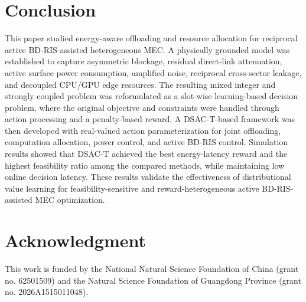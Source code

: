 \documentclass[conference]{IEEEtran}
\begin{document}
\section{Conclusion}

This paper studied energy-aware offloading and resource allocation for reciprocal active BD-RIS-assisted heterogeneous MEC. A physically grounded model was established to capture asymmetric blockage, residual direct-link attenuation, active surface power consumption, amplified noise, reciprocal cross-sector leakage, and decoupled CPU/GPU edge resources. The resulting mixed integer and strongly coupled problem was reformulated as a 
slot-wise learning-based decision problem, where the original objective and constraints were handled through action processing and a penalty-based reward. 
A DSAC-T-based framework was then developed with real-valued action parameterization for joint offloading, computation allocation, power control, and active BD-RIS control. Simulation results showed that DSAC-T achieved 
the best energy-latency reward and the highest feasibility ratio among the compared methods, while maintaining low online decision latency. These results validate the effectiveness of distributional value learning for feasibility-sensitive and reward-heterogeneous active BD-RIS-assisted MEC optimization.

\section*{Acknowledgment}

This work is funded by the National Natural Science Foundation of China (grant no. 62501509) and the Natural Science Foundation of Guangdong Province (grant no. 2026A1515011048).



\end{document}
